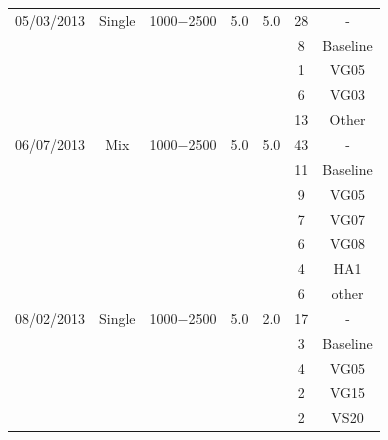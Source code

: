 \documentclass[osajnl,preprint,showpacs,superscriptaddress,12pt]{revtex4-1} %
\begin{document}
\begin{table}[h!]
\begin{center}
\begin{tabular}{c c c c c c c}
	05/03/2013 & Single & 1000$-$2500 & 5.0 & 5.0  &  28 &   -  \\
     	                   &            &                       &       &         &    8 &  Baseline\\	
     	                   &            &                       &       &         &    1 &  VG05\\ %
     	                   &            &                       &       &         &    6 &  VG03\\
     	                   &            &                       &       &         &    13 &  Other\\ %
    \hline
	06/07/2013 & Mix & 1000$-$2500 & 5.0 & 5.0  &  43 &   -  \\
	                   &            &                       &       &         &    11 &  Baseline\\	                   
	                   &            &                       &       &         &    9 &  VG05\\	                   
	                   &            &                       &       &         &    7 &  VG07\\
	                   &            &                       &       &         &    6 &  VG08\\
	                   &            &                       &       &         &    4 &  HA1\\
	                   &            &                       &       &         &    6 &  other\\ %
    \hline
	08/02/2013 & Single & 1000$-$2500 & 5.0 & 2.0  &  17 &   -  \\	
	                   &            &                       &       &         &    3 &  Baseline\\
	                   &            &                       &       &         &    4 &  VG05\\	                   
	                   &            &                       &       &         &    2 &  VG15\\
	                   &            &                       &       &         &    2 &  VS20\\

\end{tabular}
\end{center}
\end{table}
\end{document}
